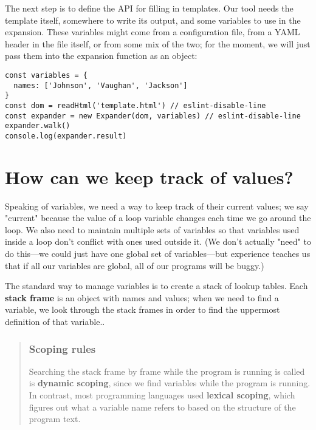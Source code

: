 \documentclass[krantzl]{krantz}
\newcommand{\glossref}[1]{\textbf{#1}}
\newenvironment{callout}{\savenotes\begin{tBox}\begin{quotation}\toggletrue{inbox}\renewcommand{\thempfootnote}{\arabic{footnote}}}{\end{quotation}\vspace{\baselineskip}\end{tBox}\togglefalse{inbox}\spewnotes}
\begin{document}
The next step is to define the API for filling in templates.
Our tool needs the template itself,
somewhere to write its output,
and some variables to use in the expansion.
These variables might come from a configuration file,
from a YAML header in the file itself,
or from some mix of the two;
for the moment,
we will just pass them into the expansion function as an object:


\begin{lstlisting}[frame=single,frameround=tttt]
const variables = {
  names: ['Johnson', 'Vaughan', 'Jackson']
}
const dom = readHtml('template.html') // eslint-disable-line
const expander = new Expander(dom, variables) // eslint-disable-line
expander.walk()
console.log(expander.result)
\end{lstlisting}


\section{How can we keep track of values?}\label{page-templates-values}


Speaking of variables,
we need a way to keep track of their current values;
we say "current" because the value of a loop variable changes each time we go around the loop.
We also need to maintain multiple sets of variables
so that variables used inside a loop
don't conflict with ones used outside it.
(We don't actually "need" to do this---we could just have one global set of variables---but
experience teaches us that if all our variables are global,
all of our programs will be buggy.)


The standard way to manage variables is to create a stack of lookup tables.
Each \glossref{stack frame} is an object with names and values;
when we need to find a variable,
we look through the stack frames in order to find the uppermost definition of that variable..

\begin{callout}


\subsubsection*{Scoping rules}


Searching the stack frame by frame
while the program is running
is called is \glossref{dynamic scoping},
since we find variables while the program is running.
In contrast,
most programming languages used \glossref{lexical scoping},
which figures out what a variable name refers to based on the structure of the program text.

\end{callout}
\end{document}
